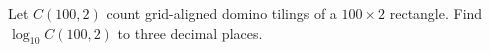 Let $C(100,2)$ count grid-aligned domino tilings of a $100\times2$ rectangle. Find $\log_{10}C(100,2)$ to three decimal places.
